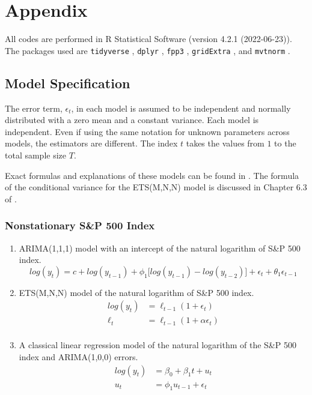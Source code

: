 \documentclass{monashthesis}
\begin{document}
\appendix

\hypertarget{appendix}{%
\chapter{Appendix}\label{appendix}}

All codes are performed in R Statistical Software (version 4.2.1 (2022-06-23)). The packages used are \texttt{tidyverse} \autocite{tidy19}, \texttt{dplyr} \autocite{dplyr23}, \texttt{fpp3} \autocite{fpp23}, \texttt{gridExtra} \autocite{gridExtra}, and \texttt{mvtnorm} \autocite{GBMMLSH21}.

\hypertarget{model-specification}{%
\section{Model Specification}\label{model-specification}}

The error term, \(\epsilon_t\), in each model is assumed to be independent and normally distributed with a zero mean and a constant variance. Each model is independent. Even if using the same notation for unknown parameters across models, the estimators are different. The index \(t\) takes the values from \(1\) to the total sample size \(T\).

Exact formulas and explanations of these models can be found in \textcite{fpp3}. The formula of the conditional variance for the ETS(M,N,N) model is discussed in Chapter 6.3 of \textcite{HKOS08}.

\hypertarget{nonstationary-sp-500-index}{%
\subsection{Nonstationary S\&P 500 Index}\label{nonstationary-sp-500-index}}

\begin{enumerate}
\def\labelenumi{\arabic{enumi}.}
\item
  ARIMA(1,1,1) model with an intercept of the natural logarithm of S\&P 500 index.
  \begin{equation*}
  log(y_t) = c + log(y_{t-1}) + \phi_1\big[log(y_{t-1})-log(y_{t-2})\big] + \epsilon_t + \theta_1\epsilon_{t-1}
  \end{equation*}
\item
  ETS(M,N,N) model of the natural logarithm of S\&P 500 index.
  \begin{align*}
  log(y_t) &= \ell_{t-1} (1+\epsilon_t) \\
  \ell_t &= \ell_{t-1} (1+\alpha \epsilon_t) \\
  \end{align*}
\item
  A classical linear regression model of the natural logarithm of the S\&P 500 index and ARIMA(1,0,0) errors.
  \begin{align*}
  log(y_t) &= \beta_0 + \beta_1 t + u_t \\
  u_t &= \phi_1 u_{t-1} + \epsilon_t
  \end{align*}
\end{enumerate}
\end{document}
